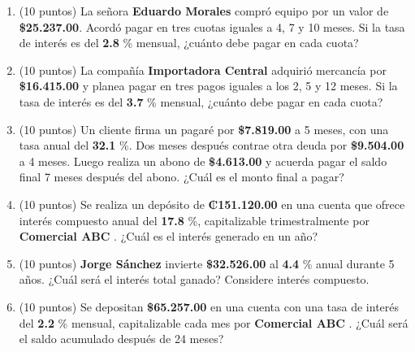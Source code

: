 \documentclass[10pt]{article}
\begin{document}
\begin{enumerate}[leftmargin=*, label=\textbf{\arabic*.}]
  \item (10 puntos) La señora \textbf{ Eduardo Morales } compró equipo por un valor de \textbf{\$\num{ 25,237.00 }}. Acordó pagar en tres cuotas iguales a 4, 7 y 10 meses. Si la tasa de interés es del \textbf{ 2.8 }\% mensual, ¿cuánto debe pagar en cada cuota?

  \vspace{0.5cm}

  \item (10 puntos) La compañía \textbf{ Importadora Central } adquirió mercancía por \textbf{\$\num{ 16,415.00 }} y planea pagar en tres pagos iguales a los 2, 5 y 12 meses. Si la tasa de interés es del \textbf{ 3.7 }\% mensual, ¿cuánto debe pagar en cada cuota?

  \vspace{0.5cm}

  \item (10 puntos) Un cliente firma un pagaré por \textbf{\$\num{ 7,819.00 }} a 5 meses, con una tasa anual del \textbf{ 32.1 }\%. Dos meses después contrae otra deuda por \textbf{\$\num{ 9,504.00 }} a 4 meses. Luego realiza un abono de \textbf{\$\num{ 4,613.00 }} y acuerda pagar el saldo final 7 meses después del abono. ¿Cuál es el monto final a pagar?

  \vspace{0.5cm}

  \item (10 puntos) Se realiza un depósito de \textbf{₡\num{ 151.120.00 }} en una cuenta que ofrece interés compuesto anual del \textbf{ 17.8 }\%, capitalizable trimestralmente por \textbf{ Comercial ABC }. ¿Cuál es el interés generado en un año?

  \vspace{0.5cm}

  \item (10 puntos) \textbf{ Jorge Sánchez } invierte \textbf{\$\num{ 32,526.00 }} al \textbf{ 4.4 }\% anual durante 5 años. ¿Cuál será el interés total ganado? Considere interés compuesto.

  \vspace{0.5cm}

  \item (10 puntos) Se depositan \textbf{\$\num{ 65,257.00 }} en una cuenta con una tasa de interés del \textbf{ 2.2 }\% mensual, capitalizable cada mes por \textbf{ Comercial ABC }. ¿Cuál será el saldo acumulado después de 24 meses?
\end{enumerate}
\end{document}
